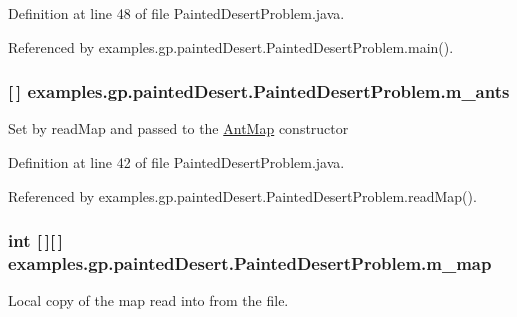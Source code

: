 Definition at line 48 of file Painted\-Desert\-Problem.\-java.



Referenced by examples.\-gp.\-painted\-Desert.\-Painted\-Desert\-Problem.\-main().

\hypertarget{classexamples_1_1gp_1_1painted_desert_1_1_painted_desert_problem_afb38b967bddd8c6ec1adbad6701943a1}{
\subsubsection[{m\-\_\-ants}]{ \mbox{[}$\,$\mbox{]} examples.\-gp.\-painted\-Desert.\-Painted\-Desert\-Problem.\-m\-\_\-ants\hspace{0.3cm}{\ttfamily [private]}}}\label{classexamples_1_1gp_1_1painted_desert_1_1_painted_desert_problem_afb38b967bddd8c6ec1adbad6701943a1}
Set by read\-Map and passed to the \hyperlink{classexamples_1_1gp_1_1painted_desert_1_1_ant_map}{Ant\-Map} constructor 

Definition at line 42 of file Painted\-Desert\-Problem.\-java.



Referenced by examples.\-gp.\-painted\-Desert.\-Painted\-Desert\-Problem.\-read\-Map().

\hypertarget{classexamples_1_1gp_1_1painted_desert_1_1_painted_desert_problem_af606a24a87999ef920af629140d8dc54}{
\subsubsection[{m\-\_\-map}]{\setlength{\rightskip}{0pt plus 5cm}int \mbox{[}$\,$\mbox{]}\mbox{[}$\,$\mbox{]} examples.\-gp.\-painted\-Desert.\-Painted\-Desert\-Problem.\-m\-\_\-map\hspace{0.3cm}{\ttfamily [private]}}}\label{classexamples_1_1gp_1_1painted_desert_1_1_painted_desert_problem_af606a24a87999ef920af629140d8dc54}
Local copy of the map read into from the file. 

